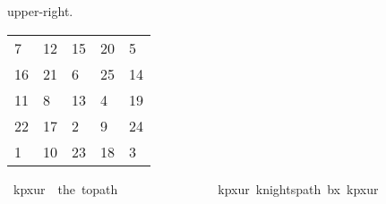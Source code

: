 \begin{isabellebody}
\begin{isamarkuptext}
upper-right.
  \begin{table}[H]
    \begin{tabular}{lllll}
       7 & 12 & 15 & 20 &  5 \\
      16 & 21 &  6 & 25 & 14 \\
      11 &  8 & 13 &  4 & 19 \\
      22 & 17 &  2 &  9 & 24 \\
       1 & 10 & 23 & 18 &  3
    \end{tabular}
  \end{table}%
\end{isamarkuptext}\isamarkuptrue%
\isamarkupfalse%
\ {\isachardoublequoteopen}kp{}x{}ur\ {\isasymequiv}\ the\ {\isacharparenleft}{\kern0pt}to{\isacharunderscore}{\kern0pt}path\ \isanewline
\ \ {\isacharbrackleft}{\kern0pt}{\isacharbrackleft}{\kern0pt}{}{\isacharcomma}{\kern0pt}{}{}{\isacharcomma}{\kern0pt}{}{}{\isacharcomma}{\kern0pt}{}{}{\isacharcomma}{\kern0pt}{}{\isacharbrackright}{\kern0pt}{\isacharcomma}{\kern0pt}\isanewline
\ \ {\isacharbrackleft}{\kern0pt}{}{}{\isacharcomma}{\kern0pt}{}{}{\isacharcomma}{\kern0pt}{}{\isacharcomma}{\kern0pt}{}{}{\isacharcomma}{\kern0pt}{}{}{\isacharbrackright}{\kern0pt}{\isacharcomma}{\kern0pt}\isanewline
\ \ {\isacharbrackleft}{\kern0pt}{}{}{\isacharcomma}{\kern0pt}{}{\isacharcomma}{\kern0pt}{}{}{\isacharcomma}{\kern0pt}{}{\isacharcomma}{\kern0pt}{}{}{\isacharbrackright}{\kern0pt}{\isacharcomma}{\kern0pt}\isanewline
\ \ {\isacharbrackleft}{\kern0pt}{}{}{\isacharcomma}{\kern0pt}{}{}{\isacharcomma}{\kern0pt}{}{\isacharcomma}{\kern0pt}{}{\isacharcomma}{\kern0pt}{}{}{\isacharbrackright}{\kern0pt}{\isacharcomma}{\kern0pt}\isanewline
\ \ {\isacharbrackleft}{\kern0pt}{}{\isacharcomma}{\kern0pt}{}{}{\isacharcomma}{\kern0pt}{}{}{\isacharcomma}{\kern0pt}{}{}{\isacharcomma}{\kern0pt}{}{\isacharbrackright}{\kern0pt}{\isacharbrackright}{\kern0pt}{\isacharparenright}{\kern0pt}{\isachardoublequoteclose}\isanewline
{}\isamarkupfalse%
\ kp{\isacharunderscore}{\kern0pt}{}x{}{\isacharunderscore}{\kern0pt}ur{\isacharcolon}{\kern0pt}\ {\isachardoublequoteopen}knights{\isacharunderscore}{\kern0pt}path\ b{}x{}\ kp{}x{}ur{\isachardoublequoteclose}\isanewline

\end{isabellebody}
